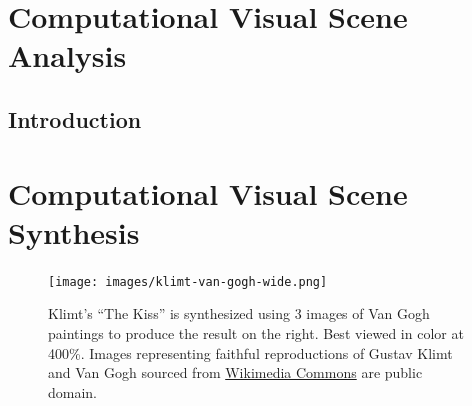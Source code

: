 \documentclass[a4paper,11pt,final]{ThesisStyle}
\begin{document}




\chapter{Computational Visual Scene Analysis}
\minitoc

\section{Introduction}  






\chapter{Computational Visual Scene Synthesis}
\minitoc

\begin{figure}[ht]
 \texttt{[image: images/klimt-van-gogh-wide.png]}
 \caption{Klimt's ``The Kiss'' is synthesized using 3 images of Van Gogh paintings to produce the result on the right.  Best viewed in color at 400\%.  Images representing faithful reproductions of Gustav Klimt and Van Gogh sourced from \href{http://commons.wikimedia.org}{Wikimedia Commons} are public domain.}
 \label{fig:teaser}
\end{figure}
\end{document}
